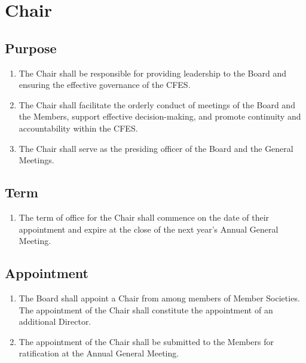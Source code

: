 \section{Chair}
\label{chair}

\subsection{Purpose}
\label{chair-purpose}

\begin{enumerate}
 \item The Chair shall be responsible for providing leadership to the Board and ensuring the effective governance of the CFES.
 \item The Chair shall facilitate the orderly conduct of meetings of the Board and the Members, support effective decision-making, and promote continuity and accountability within the CFES.
 \item The Chair shall serve as the presiding officer of the Board and the General Meetings.
\end{enumerate}

\subsection{Term}
\label{chair-term}

\begin{enumerate}
 \item The term of office for the Chair shall commence on the date of their appointment and expire at the close of the next year’s Annual General Meeting.
\end{enumerate}

\subsection{Appointment}
\label{chair-appointment}

\begin{enumerate}
 \item The Board shall appoint a Chair from among members of Member Societies. The appointment of the Chair shall constitute the appointment of an additional Director.
 \item The appointment of the Chair shall be submitted to the Members for ratification at the Annual General Meeting.
\end{enumerate}

